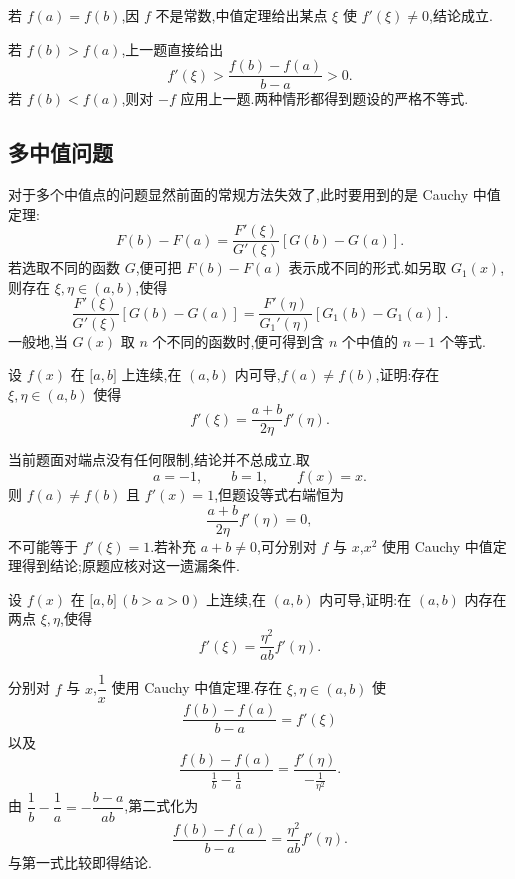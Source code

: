 \begin{solution}
    若 $f(a)=f(b)$,因 $f$ 不是常数,中值定理给出某点 $\xi$ 使 $f'(\xi)\neq0$,结论成立.

    若 $f(b)>f(a)$,上一题直接给出
    \[
        f'(\xi)>\dfrac{f(b)-f(a)}{b-a}>0.
    \]
    若 $f(b)<f(a)$,则对 $-f$ 应用上一题.两种情形都得到题设的严格不等式.
\end{solution}



\subsection{多中值问题}

对于多个中值点的问题显然前面的常规方法失效了,此时要用到的是 Cauchy 中值定理:
\[
    F(b)-F(a)=\dfrac{F'(\xi)}{G'(\xi)}[G(b)-G(a)].
\]
若选取不同的函数 $G$,便可把 $F(b)-F(a)$ 表示成不同的形式.如另取 $G_1(x)$,则存在 $\xi,\eta\in(a,b)$,使得
\[
    \dfrac{F'(\xi)}{G'(\xi)}[G(b)-G(a)]
    =\dfrac{F'(\eta)}{G_1'(\eta)}[G_1(b)-G_1(a)].
\]
一般地,当 $G(x)$ 取 $n$ 个不同的函数时,便可得到含 $n$ 个中值的 $n-1$ 个等式.

\begin{example}
    设 $f(x)$ 在 $\lbrack a,b\rbrack$ 上连续,在 $(a,b)$ 内可导,$f(a)\neq f(b)$,证明:存在 $\xi,\eta\in(a,b)$ 使得
    \[
        f'(\xi)=\dfrac{a+b}{2\eta}f'(\eta).
    \]
\end{example}
\exampleblank

\begin{solution}
    当前题面对端点没有任何限制,结论并不总成立.取
    \[
        a=-1,
        \qquad b=1,
        \qquad f(x)=x.
    \]
    则 $f(a)\neq f(b)$ 且 $f'(x)=1$,但题设等式右端恒为
    \[
        \dfrac{a+b}{2\eta}f'(\eta)=0,
    \]
    不可能等于 $f'(\xi)=1$.若补充 $a+b\neq0$,可分别对 $f$ 与 $x$,$x^2$ 使用 Cauchy 中值定理得到结论;原题应核对这一遗漏条件.
\end{solution}

\begin{example}
    设 $f(x)$ 在 $\lbrack a,b\rbrack\,(b>a>0)$ 上连续,在 $(a,b)$ 内可导,证明:在 $(a,b)$ 内存在两点 $\xi,\eta$,使得
    \[
        f'(\xi)=\dfrac{\eta^2}{ab}f'(\eta).
    \]
\end{example}
\exampleblank

\begin{solution}
    分别对 $f$ 与 $x$,$\dfrac{1}{x}$ 使用 Cauchy 中值定理.存在 $\xi,\eta\in(a,b)$ 使
    \[
        \dfrac{f(b)-f(a)}{b-a}=f'(\xi)
    \]
    以及
    \[
        \dfrac{f(b)-f(a)}{\frac{1}{b}-\frac{1}{a}}
        =\dfrac{f'(\eta)}{-\frac{1}{\eta^2}}.
    \]
    由 $\dfrac{1}{b}-\dfrac{1}{a}=-\dfrac{b-a}{ab}$,第二式化为
    \[
        \dfrac{f(b)-f(a)}{b-a}
        =\dfrac{\eta^2}{ab}f'(\eta).
    \]
    与第一式比较即得结论.
\end{solution}

